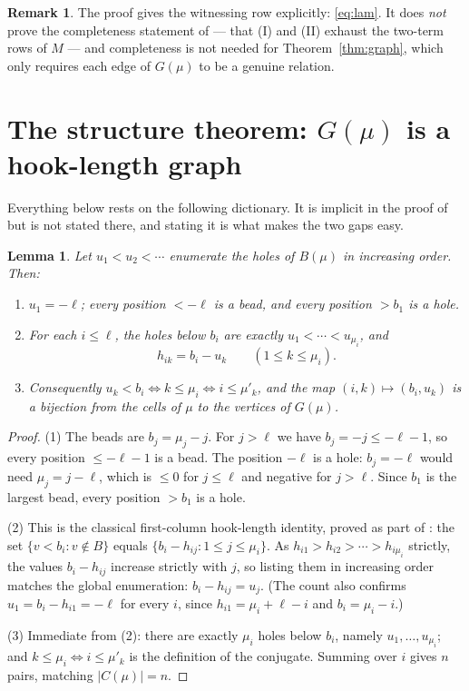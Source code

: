 \documentclass[11pt]{article}
\newtheorem{lemma}[theorem]{Lemma}
\theoremstyle{definition}
\newtheorem{remark}[theorem]{Remark}
\begin{document}
\begin{remark}
The proof gives the witnessing row explicitly: \eqref{eq:lam}. It does \emph{not} prove the
completeness statement of \cite[\S6]{Q140} --- that (I) and (II) exhaust the two-term rows of
$M$ --- and completeness is not needed for Theorem~\ref{thm:graph}, which only requires each
edge of $G(\mu)$ to be a genuine relation.
\end{remark}

\section{The structure theorem: $G(\mu)$ is a hook-length graph}\label{sec:struct}

Everything below rests on the following dictionary. It is implicit in the proof of
\cite[Prop.~2.1]{Q140} but is not stated there, and stating it is what makes the two gaps
easy.

\begin{lemma}\label{lem:dict}
Let $u_1<u_2<\cdots$ enumerate the holes of $B(\mu)$ in increasing order. Then:
\begin{enumerate}
\item $u_1=-\ell$; every position $<-\ell$ is a bead, and every position $>b_1$ is a hole.
\item For each $i\le\ell$, the holes below $b_i$ are exactly $u_1<\cdots<u_{\mu_i}$, and
      \[ h_{ik}=b_i-u_k \qquad (1\le k\le \mu_i). \]
\item Consequently $u_k<b_i \iff k\le\mu_i \iff i\le\mu'_k$, and the map
      $(i,k)\mapsto(b_i,u_k)$ is a bijection from the cells of $\mu$ to the vertices of
      $G(\mu)$.
\end{enumerate}
\end{lemma}

\begin{proof}
(1) The beads are $b_j=\mu_j-j$. For $j>\ell$ we have $b_j=-j\le-\ell-1$, so every position
$\le-\ell-1$ is a bead. The position $-\ell$ is a hole: $b_j=-\ell$ would need $\mu_j=j-\ell$,
which is $\le0$ for $j\le\ell$ and negative for $j>\ell$. Since $b_1$ is the largest bead,
every position $>b_1$ is a hole.

(2) This is the classical first-column hook-length identity, proved as part of
\cite[Prop.~2.1]{Q140}: the set $\{v<b_i : v\notin B\}$ equals $\{b_i-h_{ij}:1\le j\le\mu_i\}$.
As $h_{i1}>h_{i2}>\cdots>h_{i\mu_i}$ strictly, the values $b_i-h_{ij}$ increase strictly with
$j$, so listing them in increasing order matches the global enumeration: $b_i-h_{ij}=u_j$.
(The count also confirms $u_1=b_i-h_{i1}=-\ell$ for every $i$, since
$h_{i1}=\mu_i+\ell-i$ and $b_i=\mu_i-i$.)

(3) Immediate from (2): there are exactly $\mu_i$ holes below $b_i$, namely $u_1,\dots,u_{\mu_i}$;
and $k\le\mu_i\iff i\le\mu'_k$ is the definition of the conjugate. Summing over $i$ gives $n$
pairs, matching $|C(\mu)|=n$.
\end{proof}
\end{document}
